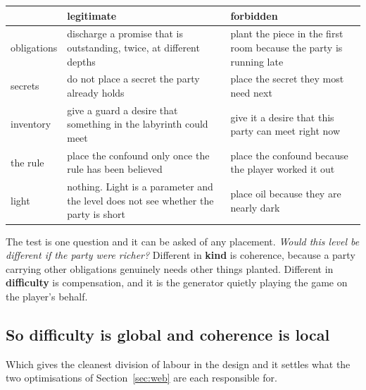 \documentclass[11pt,a4paper]{article}
\begin{document}
\begin{center}
\begin{tabular}{@{}l@{\hspace{3mm}}>{\raggedright\arraybackslash}p{}@{\hspace{3mm}}>{\raggedright\arraybackslash}p{}@{}}
\toprule
& \textbf{legitimate} & \textbf{forbidden} \\
\midrule
obligations & discharge a promise that is outstanding, twice, at different depths &
plant the piece in the first room because the party is running late \\[1mm]
secrets     & do not place a secret the party already holds &
place the secret they most need next \\[1mm]
inventory   & give a guard a desire that something in the labyrinth could meet &
give it a desire that this party can meet right now \\[1mm]
the rule    & place the confound only once the rule has been believed &
place the confound because the player worked it out \\[1mm]
light       & nothing. Light is a parameter and the level does not see whether the party is short &
place oil because they are nearly dark \\
\bottomrule
\end{tabular}
\end{center}

\begin{sectionbox}
The test is one question and it can be asked of any placement. \emph{Would this level be different
if the party were richer?} Different in \textbf{kind} is coherence, because a party carrying other
obligations genuinely needs other things planted. Different in \textbf{difficulty} is compensation,
and it is the generator quietly playing the game on the player's behalf.
\end{sectionbox}

\subsection{So difficulty is global and coherence is local}
\label{sec:global}

Which gives the cleanest division of labour in the design and it settles what the two optimisations
of Section~\ref{sec:web} are each responsible for.
\end{document}
